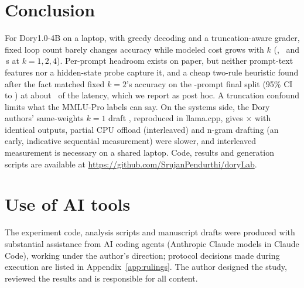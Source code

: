 \documentclass[11pt]{article}
\makeatletter
\def\sg@aux#1#2\relax{\if#1-$-$#2\else\if#1+{+}#2\else{+}#1#2\fi\fi}
\newcommand{\sg}[1]{\expandafter\sg@aux#1\relax}
\makeatother
\begin{document}
\section{Conclusion}
For Dory1.0-4B on a laptop, with greedy decoding and a truncation-aware grader, fixed loop count barely changes accuracy while modeled cost grows with $k$ (\HoldoutFixedOneSec, \HoldoutFixedTwoSec\ and \HoldoutFixedFourSec\,s at $k{=}1,2,4$). Per-prompt headroom exists on paper, but neither prompt-text features nor a hidden-state probe capture it, and a cheap two-rule heuristic found after the fact matched fixed $k{=}2$'s accuracy on the \FinalN-prompt final split (95\% CI \sg{\FinalFloorLo} to \sg{\FinalFloorHi}) at about \FloorLatencyRatio\ of the latency, which we report as post hoc. A truncation confound limits what the MMLU-Pro labels can say. On the systems side, the Dory authors' same-weights $k{=}1$ draft \citep{dory2026}, reproduced in llama.cpp, gives \SpecNFourSpeedup$\times$ with identical outputs, partial CPU offload (interleaved) and n-gram drafting (an early, indicative sequential measurement) were slower, and interleaved measurement is necessary on a shared laptop. Code, results and generation scripts are available at \url{https://github.com/SrujanPendurthi/doryLab}.

\section*{Use of AI tools}
The experiment code, analysis scripts and manuscript drafts were produced with substantial assistance from AI coding agents (Anthropic Claude models in Claude Code), working under the author's direction; protocol decisions made during execution are listed in Appendix~\ref{app:rulings}. The author designed the study, reviewed the results and is responsible for all content.




\appendix
\end{document}
